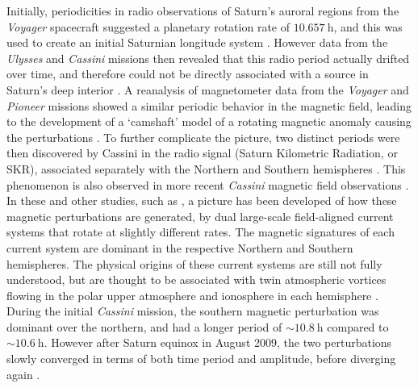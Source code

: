 Initially, periodicities in radio observations of Saturn's auroral regions from the \textit{Voyager} spacecraft suggested a planetary rotation rate of $\SI{10.657}{\hour}$, and this was used to create an initial Saturnian longitude system \citep{desch1981}. However data from the \textit{Ulysses} and \textit{Cassini} missions then revealed that this radio period actually drifted over time, and therefore could not be directly associated with a source in Saturn's deep interior \citep[e.g.][]{gurnett2005}. A reanalysis of magnetometer data from the \textit{Voyager} and \textit{Pioneer} missions showed a similar periodic behavior in the magnetic field, leading to the development of a `camshaft' model of a rotating magnetic anomaly causing the perturbations \citep{espinosa2003b}. To further complicate the picture, two distinct periods were then discovered by Cassini in the radio signal (Saturn Kilometric Radiation, or SKR), associated separately with the Northern and Southern hemispheres \citep{gurnett2009}. This phenomenon is also observed in more recent \textit{Cassini} magnetic field observations \citep[e.g.][]{andrews2010,provan2012}. In these and other studies, such as \citet{hunt2014}, a picture has been developed of how these magnetic perturbations are generated, by dual large-scale field-aligned current systems that rotate at slightly different rates. The magnetic signatures of each current system are dominant in the respective Northern and Southern hemispheres. The physical origins of these current systems are still not fully understood, but are thought to be associated with twin atmospheric vortices flowing in the polar upper atmosphere and ionosphere in each hemisphere \citep{jiaandkivelson2012, smith2012, southwood2014, smith2016}. During the initial \textit{Cassini} mission, the southern magnetic perturbation was dominant over the northern, and had a longer period of ${\sim}\SI{10.8}{\hour}$ compared to ${\sim}\SI{10.6}{\hour}$. However after Saturn equinox in August 2009, the two perturbations slowly converged in terms of both time period and amplitude, before diverging again \citep{andrews2012}.

